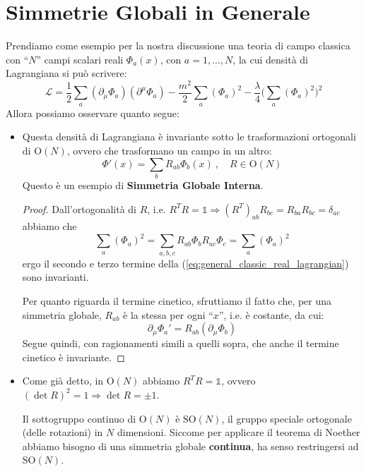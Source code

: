\documentclass[../main.tex]{subfiles}
\begin{document}
\section{Simmetrie Globali in Generale}
Prendiamo come esempio per la nostra discussione una teoria di campo classica con “$N$” campi scalari reali $\Phi_a(x)$, con $a=1,...,N$, la cui densità di Lagrangiana si può scrivere:
\begin{equation}
    \boxed{\mathscr{L} = \frac{1}{2}\sum_a(\partial_\mu\Phi_a)(\partial^\mu\Phi_a) - \frac{m^2}{2}\sum_a(\Phi_a)^2 - \frac{\lambda}{4}\Big(\sum_a (\Phi_a)^2\Big)^2}
    \label{eq:general_classic_real_lagrangian}
\end{equation}
Allora possiamo osservare quanto segue:
\begin{itemize}
    \item Questa densità di Lagrangiana è invariante sotto le trasformazioni ortogonali di $\textrm{O}(N)$, ovvero che trasformano un campo in un altro:
    \begin{equation}
        \boxed{
        \Phi'(x) = \sum_b R_{ab}\Phi_b(x)~,\quad R\in\textrm{O}(N)
        }
        \label{eq:O_n_internal_symm}
    \end{equation}
    Questo è un esempio di \textbf{Simmetria Globale Interna}.

    \begin{proof}
        Dall'ortogonalità di $R$, i.e. $R^TR=\mathbb 1 \Rightarrow (R^T)_{ab}R_{bc} = R_{ba}R_{bc} =\delta_{ac}$ abbiamo che 
        \[
        \sum_a(\Phi_a)^2 = \sum_{a,b,c} R_{ab}\Phi_b R_{ac}\Phi_c = \sum_a (\Phi_a)^2
        \]
        ergo il secondo e terzo termine della (\ref{eq:general_classic_real_lagrangian}) sono invarianti.

        Per quanto riguarda il termine cinetico, sfruttiamo il fatto che, per una simmetria globale, $R_{ab}$ è la stessa per ogni “$x$”, i.e. è costante, da cui:
        \[
        \partial_\mu\Phi_a' = R_{ab}(\partial_\mu\Phi_b)
        \]
        Segue quindi, con ragionamenti simili a quelli sopra, che anche il termine cinetico è invariante.
    \end{proof}

    \item Come già detto, in $\textrm{O}(N)$ abbiamo  $R^TR=\mathbb 1$, ovvero $(\det R)^2 = 1 \Rightarrow \det R = \pm 1$.

    Il sottogruppo continuo di $\textrm{O}(N)$ è $\textrm{SO}(N)$, il gruppo speciale ortogonale (delle rotazioni) in $N$ dimensioni. Siccome per applicare il teorema di Noether abbiamo bisogno di una simmetria globale \textbf{continua}, ha senso restringersi ad $\textrm{SO}(N)$. 


\end{itemize}
\end{document}
